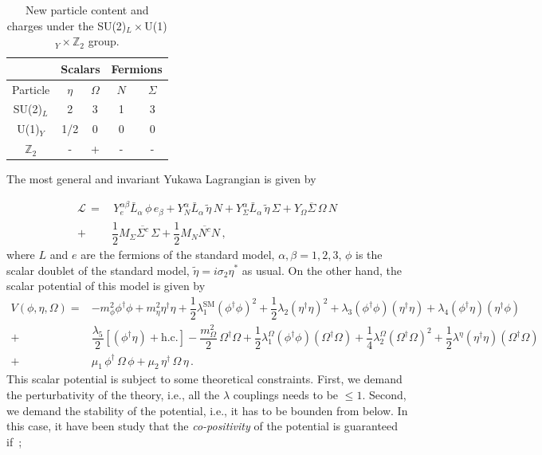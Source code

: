 \documentclass[12pt,letterpaper]{article}
\begin{document}
   
\begin{table}
\centering
\begin{tabular}{|c|c|c|c|c|}
\hline
 \multicolumn{1}{|c}{   }  &
 \multicolumn{2}{|c}{ Scalars  } &
  \multicolumn{2}{|c|}{ Fermions  }  \\
 \hline 
Particle & $\eta$ & $\Omega$ & $N$ & $\Sigma$\\
\hline
SU(2)$_L$ &2 &3 &1 &3\\
U(1)$_Y$ &1/2 &0 &0 &0\\
$\mathbb{Z}_2$ & - &+ &- &-\\
\hline
\end{tabular}
\caption{New particle content and charges under the SU(2)$_L\times
$U(1)$_Y\times\mathbb{Z}_2$ group.}
\label{tab:new-particle-content}
\end{table}


The most general and invariant Yukawa Lagrangian is given by

\begin{align}
\label{eq:full-lagrangian}
\mathcal{L}\, = &\, Y_e^{\alpha\beta}\bar{L}_{\alpha}\,\phi\, e_{\beta}
+  Y_N^{\alpha}\bar{L}_{\alpha}\,\tilde{\eta}\, N 
+  Y_{\Sigma}^{\alpha}\bar{L}_{\alpha}\,\tilde{\eta}\, \Sigma 
+  Y_{\Omega}\overline{\Sigma}\,\Omega\, N\nonumber \\
+& \dfrac{1}{2}M_{\Sigma}\overline{\Sigma^c}\,\Sigma
+ \dfrac{1}{2}M_{N}\overline{N^c}N \,,
\end{align}
%
where $L$ and $e$ are the fermions of the standard model, $\alpha,\beta=1,2,3$, $\phi$ is the scalar doublet of the standard model, $\tilde{\eta}=i\sigma_2\eta^*$ as usual. On the other hand, the scalar potential of this model is given by
%
\begin{align}
\label{eq:scalar-potential}
V(\phi,\eta, \Omega) = &
-m_{\phi}^2 \phi^{\dagger}\phi + m_{\eta}^2 \eta^{\dagger}\eta
+\dfrac{1}{2}\lambda_1^{\text{SM}} (\phi^{\dagger}\phi)^2
+\dfrac{1}{2}\lambda_2 (\eta^{\dagger}\eta)^2
+\lambda_3 (\phi^{\dagger}\phi)(\eta^{\dagger}\eta)
+\lambda_4 (\phi^{\dagger}\eta)(\eta^{\dagger}\phi) \nonumber \\
+& \dfrac{\lambda_5}{2}\left[(\phi^{\dagger}\eta) + \text{h.c.}\right]
-\dfrac{m_{\Omega}^2}{2}\,\Omega^{\dagger}\Omega
+\dfrac{1}{2}\lambda_1^{\Omega} (\phi^{\dagger}\phi)(\Omega^{\dagger}\Omega)
+\dfrac{1}{4}\lambda_2^{\Omega} (\Omega^{\dagger}\Omega)^2
+\dfrac{1}{2}\lambda^{\eta} (\eta^{\dagger}\eta)(\Omega^{\dagger}\Omega)\nonumber \\
+& \mu_1\,\phi^{\dagger}\,\Omega\,\phi + \mu_2\,\eta^{\dagger}\,\Omega\,\eta\,.
\end{align}
%
This scalar potential is subject to some theoretical constraints. First, we demand the perturbativity of the theory, i.e., all the $\lambda$ couplings needs to be $\leq 1$. Second, we demand the stability of the potential, i.e., it has to be bounden from below. In this case, it have been study that the \textit{co-positivity} of the potential is guaranteed if~\cite{Merle:2016scw};
\end{document}
